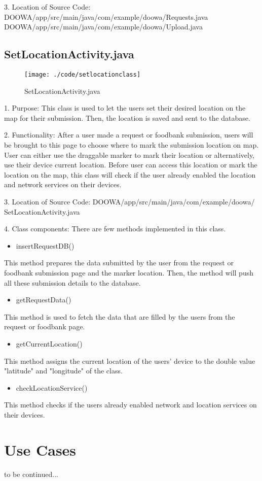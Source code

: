 \documentclass[conference]{IEEEtran}
\begin{document}
3. Location of Source Code: DOOWA/app/src/main/java/com/example/doowa/Requests.java\\
 DOOWA/app/src/main/java/com/example/doowa/Upload.java
\break
\break
\subsection{SetLocationActivity.java}
\begin{figure}[h!]
\texttt{[image: ./code/setlocationclass]}
\centering
\caption{SetLocationActivity.java}
\end{figure}
1. Purpose: This class is used to let the users set their desired location on the map for their submission. Then, the location is saved and sent to the database.\break
\par 2. Functionality: After a user made a request or foodbank submission, users will be brought to this page to choose where to mark the submission location on map. User can either use the draggable marker to mark their location or alternatively, use their device current location. Before user can access this location or mark the location on the map, this class will check if the user already enabled the location and network services on their devices. \break

3. Location of Source Code: DOOWA/app/src/main/java/com/example/doowa/ SetLocationActivity.java\break

4. Class components: There are few methods implemented in this class.
\begin{itemize}
\item insertRequestDB()
\end{itemize}
This method prepares the data submitted by the user from the request or foodbank submission page and the marker location. Then, the method will push all these submission details to the database. 
\begin{itemize}
\item  getRequestData()
\end{itemize}
This method is used to fetch the data that are filled by the users from the request or foodbank page.
\begin{itemize}
\item getCurrentLocation()
\end{itemize}
This method assigns the current location of the users' device to the double value "latitude" and "longitude" of the class.
\begin{itemize}
\item checkLocationService()
\end{itemize}
This method checks if the users already enabled network and location services on their devices.
\newpage


\section{Use Cases}
to be continued...
\end{document}
